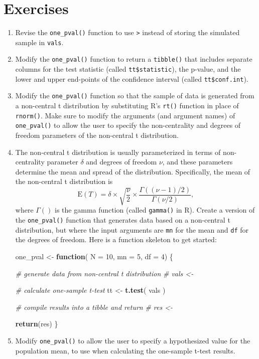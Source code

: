\documentclass[
]{book}
\newenvironment{Shaded}{\begin{snugshade}}{\end{snugshade}}
\newcommand{\AttributeTok}[1]{\textcolor[rgb]{0.13,0.29,0.53}{#1}}
\newcommand{\CommentTok}[1]{\textcolor[rgb]{0.56,0.35,0.01}{\textit{#1}}}
\newcommand{\ControlFlowTok}[1]{\textcolor[rgb]{0.13,0.29,0.53}{\textbf{#1}}}
\newcommand{\DecValTok}[1]{\textcolor[rgb]{0.00,0.00,0.81}{#1}}
\newcommand{\FunctionTok}[1]{\textcolor[rgb]{0.13,0.29,0.53}{\textbf{#1}}}
\newcommand{\NormalTok}[1]{#1}
\newcommand{\OtherTok}[1]{\textcolor[rgb]{0.56,0.35,0.01}{#1}}
\begin{document}
\section{Exercises}\label{exercises}

\begin{enumerate}
\def\labelenumi{\arabic{enumi}.}
\item
  Revise the \texttt{one\_pval()} function to use \texttt{\textbar{}\textgreater{}} instead of storing the simulated sample in \texttt{vals}.
\item
  Modify the \texttt{one\_pval()} function to return a \texttt{tibble()} that includes separate columns for the test statistic (called \texttt{tt\$statistic}), the p-value, and the lower and upper end-points of the confidence interval (called \texttt{tt\$conf.int}).
\item
  Modify the \texttt{one\_pval()} function so that the sample of data is generated from a non-central t distribution by substituting R's \texttt{rt()} function in place of \texttt{rnorm()}. Make sure to modify the arguments (and argument names) of \texttt{one\_pval()} to allow the user to specify the non-centrality and degrees of freedom parameters of the non-central t distribution.
\item
  The non-central t distribution is usually parameterized in terms of non-centrality parameter \(\delta\) and degrees of freedom \(\nu\), and these parameters determine the mean and spread of the distribution. Specifically, the mean of the non-central t distribution is
  \[\text{E}(T) = \delta \times \sqrt{\frac{\nu}{2}} \times \frac{\Gamma((\nu - 1) / 2)}{\Gamma(\nu / 2)},\]
  where \(\Gamma()\) is the gamma function (called \texttt{gamma()} in R). Create a version of the \texttt{one\_pval()} function that generates data based on a non-central t distribution, but where the input arguments are \texttt{mn} for the mean and \texttt{df} for the degrees of freedom. Here is a function skeleton to get started:

\begin{Shaded}
\begin{Highlighting}[]
\NormalTok{one\_pval }\OtherTok{\textless{}{-}} \ControlFlowTok{function}\NormalTok{( }\AttributeTok{N =} \DecValTok{10}\NormalTok{, }\AttributeTok{mn =} \DecValTok{5}\NormalTok{, }\AttributeTok{df =} \DecValTok{4}\NormalTok{) \{}

  \CommentTok{\# generate data from non{-}central t distribution}
  \CommentTok{\# vals \textless{}{-} }

  \CommentTok{\# calculate one{-}sample t{-}test}
\NormalTok{  tt }\OtherTok{\textless{}{-}} \FunctionTok{t.test}\NormalTok{( vals )}

  \CommentTok{\# compile results into a tibble and return}
  \CommentTok{\# res \textless{}{-} }

  \FunctionTok{return}\NormalTok{(res)}
\NormalTok{\}}
\end{Highlighting}
\end{Shaded}
\item
  Modify \texttt{one\_pval()} to allow the user to specify a hypothesized value for the population mean, to use when calculating the one-sample t-test results.
\end{enumerate}
\end{document}
